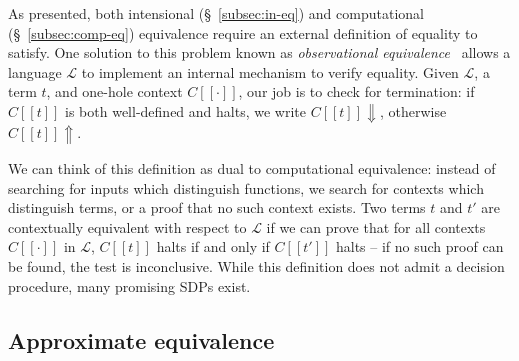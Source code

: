 \documentclass[11pt]{article}
\begin{document}
    As presented, both intensional (\S~\ref{subsec:in-eq}) and computational (\S~\ref{subsec:comp-eq}) equivalence require an external definition of equality to satisfy. One solution to this problem known as \textit{observational equivalence}~\cite{morris1969lambda} allows a language $\mathcal{L}$ to implement an internal mechanism to verify equality. Given $\mathcal{L}$, a term $t$, and one-hole context $C[\![\cdot]\!]$, our job is to check for termination: if $C[\![t]\!]$ is both well-defined and halts, we write $C[\![t]\!]\Downarrow$, otherwise $C[\![t]\!]\Uparrow$.



    We can think of this definition as dual to computational equivalence: instead of searching for inputs which distinguish functions, we search for contexts which distinguish terms, or a proof that no such context exists. Two terms $t$ and $t'$ are contextually equivalent with respect to $\mathcal{L}$ if we can prove that for all contexts $C[\![\cdot]\!]$ in $\mathcal{L}$, $C[\![t]\!]$ halts if and only if $C[\![t']\!]$ halts -- if no such proof can be found, the test is inconclusive. While this definition does not admit a decision procedure, many promising SDPs exist.



    \subsection{Approximate equivalence}\label{sec:ap-eq}
\end{document}
